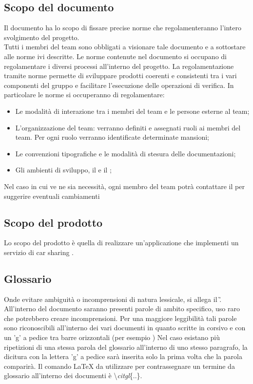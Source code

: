 \subsection{Scopo del documento}
Il documento ha lo scopo di fissare precise norme che regolamenteranno
l’intero svolgimento del progetto. \\
Tutti i membri del team sono obbligati a visionare tale documento e a sottostare alle norme ivi descritte.
Le norme contenute nel documento si occupano di regolamentare i diversi processi all'interno del progetto. La regolamentazione tramite norme permette di sviluppare prodotti coerenti e consistenti tra i vari componenti del gruppo e facilitare l’esecuzione delle  operazioni di verifica.
In particolare le norme si occuperanno di regolamentare:
    \begin{itemize}
        \item Le modalità di interazione tra i membri del team e le persone esterne al team;
        \item L'organizzazione del team: verranno definiti e assegnati ruoli ai membri del team. Per ogni ruolo verranno identificate determinate mansioni;
        \item Le convenzioni tipografiche e le modalità di stesura delle documentazioni;
        \item Gli ambienti di sviluppo, il  e il ;
    \end{itemize}

Nel caso in cui ve ne sia necessità, ogni membro del team potrà contattare il
 per suggerire eventuali cambiamenti
\subsection{Scopo del prodotto}
Lo scopo del prodotto è quella di realizzare un'applicazione  che implementi un servizio di car sharing .

\subsection{Glossario}
Onde evitare ambiguità o incomprensioni di natura lessicale, si allega il \G.
All'interno del documento saranno presenti parole di ambito specifico, uso raro che potrebbero creare incomprensioni. Per una maggiore leggibilità tali parole sono riconoscibili all'interno dei vari documenti in quanto scritte in corsivo e con un 'g' a pedice tra barre orizzontali (per esempio )
Nel caso esistano più ripetizioni di una stessa parola del glossario all'interno di uno stesso paragrafo, la dicitura con la lettera 'g' a pedice sarà inserita solo la prima volta che la parola comparirà.
Il comando LaTeX da utilizzare per contrassegnare un termine da glossario all’interno dei documenti è \textbackslash \textit{citgl}\{..\}.



